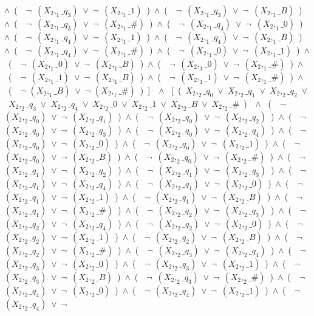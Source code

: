 ﻿\documentclass[a4paper,10pt]{article}
\begin{document}
$\wedge$\ (\ \ $\neg$\ $(X_2,_1\_q_3)$\ $\vee$\ $\neg$\ $(X_2,_1\_1)$\ )\ $\wedge$\ (\ \ $\neg$\ $(X_2,_1\_q_3)$\ $\vee$\ $\neg$\ $(X_2,_1\_B)$\ )\ $\wedge$\ (\ \ $\neg$\ $(X_2,_1\_q_3)$\ $\vee$\ $\neg$\ $(X_2,_1\_\#)$\ )\ $\wedge$\ (\ \ $\neg$\ $(X_2,_1\_q_4)$\ $\vee$\ $\neg$\ $(X_2,_1\_0)$\ )\ $\wedge$\ (\ \ $\neg$\ $(X_2,_1\_q_4)$\ $\vee$\ $\neg$\ $(X_2,_1\_1)$\ )\ $\wedge$\ (\ \ $\neg$\ $(X_2,_1\_q_4)$\ $\vee$\ $\neg$\ $(X_2,_1\_B)$\ )\ $\wedge$\ (\ \ $\neg$\ $(X_2,_1\_q_4)$\ $\vee$\ $\neg$\ $(X_2,_1\_\#)$\ )\ $\wedge$\ (\ \ $\neg$\ $(X_2,_1\_0)$\ $\vee$\ $\neg$\ $(X_2,_1\_1)$\ )\ $\wedge$\ (\ \ $\neg$\ $(X_2,_1\_0)$\ $\vee$\ $\neg$\ $(X_2,_1\_B)$\ )\ $\wedge$\ (\ \ $\neg$\ $(X_2,_1\_0)$\ $\vee$\ $\neg$\ $(X_2,_1\_\#)$\ )\ $\wedge$\ (\ \ $\neg$\ $(X_2,_1\_1)$\ $\vee$\ $\neg$\ $(X_2,_1\_B)$\ )\ $\wedge$\ (\ \ $\neg$\ $(X_2,_1\_1)$\ $\vee$\ $\neg$\ $(X_2,_1\_\#)$\ )\ $\wedge$\ (\ \ $\neg$ $(X_2,_1\_B)$\ $\vee$\ $\neg$ $(X_2,_1\_\#)$\ )\ ]\ \ $\wedge$ \ [\ (\ $X_2,_2\_q_0$\ $\vee$\ $X_2,_2\_q_1$\ $\vee$\ $X_2,_2\_q_2$\ $\vee$\ $X_2,_2\_q_3$\ $\vee$\ $X_2,_2\_q_4$\ $\vee$\ $X_2,_2\_0$\ $\vee$\ $X_2,_2\_1$\ $\vee$\ $X_2,_2\_B$\ $\vee$\ $X_2,_2\_\#$\ )\ \ $\wedge$ \ (\ \ $\neg$\ $(X_2,_2\_q_0)$\ $\vee$\ $\neg$\ $(X_2,_2\_q_1)$\ )\ $\wedge$\ (\ \ $\neg$\ $(X_2,_2\_q_0)$\ $\vee$\ $\neg$\ $(X_2,_2\_q_2)$\ )\ $\wedge$\ (\ \ $\neg$\ $(X_2,_2\_q_0)$\ $\vee$\ $\neg$\ $(X_2,_2\_q_3)$\ )\ $\wedge$\ (\ \ $\neg$\ $(X_2,_2\_q_0)$\ $\vee$\ $\neg$\ $(X_2,_2\_q_4)$\ )\ $\wedge$\ (\ \ $\neg$\ $(X_2,_2\_q_0)$\ $\vee$\ $\neg$\ $(X_2,_2\_0)$\ )\ $\wedge$\ (\ \ $\neg$\ $(X_2,_2\_q_0)$\ $\vee$\ $\neg$\ $(X_2,_2\_1)$\ )\ $\wedge$\ (\ \ $\neg$\ $(X_2,_2\_q_0)$\ $\vee$\ $\neg$\ $(X_2,_2\_B)$\ )\ $\wedge$\ (\ \ $\neg$\ $(X_2,_2\_q_0)$\ $\vee$\ $\neg$\ $(X_2,_2\_\#)$\ )\ $\wedge$\ (\ \ $\neg$\ $(X_2,_2\_q_1)$\ $\vee$\ $\neg$\ $(X_2,_2\_q_2)$\ )\ $\wedge$\ (\ \ $\neg$\ $(X_2,_2\_q_1)$\ $\vee$\ $\neg$\ $(X_2,_2\_q_3)$\ )\ $\wedge$\ (\ \ $\neg$\ $(X_2,_2\_q_1)$\ $\vee$\ $\neg$\ $(X_2,_2\_q_4)$\ )\ $\wedge$\ (\ \ $\neg$\ $(X_2,_2\_q_1)$\ $\vee$\ $\neg$\ $(X_2,_2\_0)$\ )\ $\wedge$\ (\ \ $\neg$\ $(X_2,_2\_q_1)$\ $\vee$\ $\neg$\ $(X_2,_2\_1)$\ )\ $\wedge$\ (\ \ $\neg$\ $(X_2,_2\_q_1)$\ $\vee$\ $\neg$\ $(X_2,_2\_B)$\ )\ $\wedge$\ (\ \ $\neg$\ $(X_2,_2\_q_1)$\ $\vee$\ $\neg$\ $(X_2,_2\_\#)$\ )\ $\wedge$\ (\ \ $\neg$\ $(X_2,_2\_q_2)$\ $\vee$\ $\neg$\ $(X_2,_2\_q_3)$\ )\ $\wedge$\ (\ \ $\neg$\ $(X_2,_2\_q_2)$\ $\vee$\ $\neg$\ $(X_2,_2\_q_4)$\ )\ $\wedge$\ (\ \ $\neg$\ $(X_2,_2\_q_2)$\ $\vee$\ $\neg$\ $(X_2,_2\_0)$\ )\ $\wedge$\ (\ \ $\neg$\ $(X_2,_2\_q_2)$\ $\vee$\ $\neg$\ $(X_2,_2\_1)$\ )\ $\wedge$\ (\ \ $\neg$\ $(X_2,_2\_q_2)$\ $\vee$\ $\neg$\ $(X_2,_2\_B)$\ )\ $\wedge$\ (\ \ $\neg$\ $(X_2,_2\_q_2)$\ $\vee$\ $\neg$\ $(X_2,_2\_\#)$\ )\ $\wedge$\ (\ \ $\neg$\ $(X_2,_2\_q_3)$\ $\vee$\ $\neg$\ $(X_2,_2\_q_4)$\ )\ $\wedge$\ (\ \ $\neg$\ $(X_2,_2\_q_3)$\ $\vee$\ $\neg$\ $(X_2,_2\_0)$\ )\ $\wedge$\ (\ \ $\neg$\ $(X_2,_2\_q_3)$\ $\vee$\ $\neg$\ $(X_2,_2\_1)$\ )\ $\wedge$\ (\ \ $\neg$\ $(X_2,_2\_q_3)$\ $\vee$\ $\neg$\ $(X_2,_2\_B)$\ )\ $\wedge$\ (\ \ $\neg$\ $(X_2,_2\_q_3)$\ $\vee$\ $\neg$\ $(X_2,_2\_\#)$\ )\ $\wedge$\ (\ \ $\neg$\ $(X_2,_2\_q_4)$\ $\vee$\ $\neg$\ $(X_2,_2\_0)$\ )\ $\wedge$\ (\ \ $\neg$\ $(X_2,_2\_q_4)$\ $\vee$\ $\neg$\ $(X_2,_2\_1)$\ )\ $\wedge$\ (\ \ $\neg$\ $(X_2,_2\_q_4)$\ $\vee$\ $\neg$\ 
\end{document}
